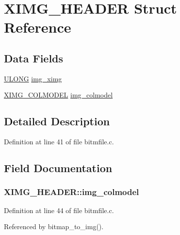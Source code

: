 \hypertarget{structXIMG__HEADER}{\section{X\+I\+M\+G\+\_\+\+H\+E\+A\+D\+E\+R Struct Reference}
\label{structXIMG__HEADER}
}
\subsection*{Data Fields}
\begin{DoxyCompactItemize}
\item 
\hyperlink{def__os2_8h_af632da489ebc3708ec3ab6791ee53fa4}{U\+L\+O\+N\+G} \hyperlink{structXIMG__HEADER_aaeba1879c57396ae9d15c097113b07c5}{img\+\_\+ximg}
\item 
\hyperlink{bitmfile_8c_af08f42f04fcb2073807ade62eef86121}{X\+I\+M\+G\+\_\+\+C\+O\+L\+M\+O\+D\+E\+L} \hyperlink{structXIMG__HEADER_afec6d437ff4d53ce565007675c4d6dfb}{img\+\_\+colmodel}
\end{DoxyCompactItemize}


\subsection{Detailed Description}


Definition at line 41 of file bitmfile.\+c.



\subsection{Field Documentation}
\hypertarget{structXIMG__HEADER_afec6d437ff4d53ce565007675c4d6dfb}{
\subsubsection[{img\+\_\+colmodel}]{ X\+I\+M\+G\+\_\+\+H\+E\+A\+D\+E\+R\+::img\+\_\+colmodel}}\label{structXIMG__HEADER_afec6d437ff4d53ce565007675c4d6dfb}


Definition at line 44 of file bitmfile.\+c.



Referenced by bitmap\+\_\+to\+\_\+img().


